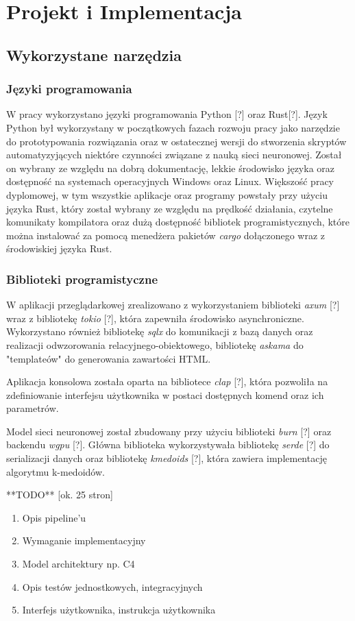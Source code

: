 \clearpage
\section{Projekt i Implementacja}

    \subsection{Wykorzystane narzędzia}

        \subsubsection{Języki programowania}

            W pracy wykorzystano języki programowania Python [?] oraz Rust[?]. 
            Język Python był wykorzystany w początkowych fazach rozwoju pracy jako narzędzie do prototypowania rozwiązania oraz w ostatecznej wersji do stworzenia skryptów automatyzyjących niektóre czynności związane z nauką sieci neuronowej. Został on wybrany ze względu na dobrą dokumentację, lekkie środowisko języka oraz dostępność na systemach operacyjnych Windows oraz Linux.
            Większość pracy dyplomowej, w tym wszystkie aplikacje oraz programy powstały przy użyciu języka Rust, który został wybrany ze względu na prędkość działania, czytelne komunikaty kompilatora oraz dużą dostępność bibliotek programistycznych, które można instalować za pomocą menedżera pakietów \textit{cargo} dołączonego wraz z środowiskiej języka Rust.

        \subsubsection{Biblioteki programistyczne}

            W aplikacji przeglądarkowej zrealizowano z wykorzystaniem biblioteki \textit{axum} [?] wraz z bibliotekę \textit{tokio} [?], która zapewniła środowisko asynchroniczne. Wykorzystano również bibliotekę \textit{sqlx} do komunikacji z bazą danych oraz realizacji odwzorowania relacyjnego-obiektowego, bibliotekę \textit{askama} do "templateów" do generowania zawartości HTML.

            Aplikacja konsolowa została oparta na bibliotece \textit{clap} [?], która pozwoliła na zdefiniowanie interfejsu użytkownika w postaci dostępnych komend oraz ich parametrów. 

            Model sieci neuronowej został zbudowany przy użyciu biblioteki \textit{burn} [?] oraz backendu \textit{wgpu} [?]. 
            Główna biblioteka wykorzystywała bibliotekę \textit{serde} [?] do serializacji danych oraz bibliotekę \textit{kmedoids} [?], która zawiera implementację algorytmu k-medoidów.

**TODO** [ok. 25 stron]

\begin{enumerate}
    \item Opis pipeline'u
    \item Wymaganie implementacyjny
    \item Model architektury np. C4
    \item Opis testów jednostkowych, integracyjnych
    \item Interfejs użytkownika, instrukcja użytkownika
\end{enumerate}